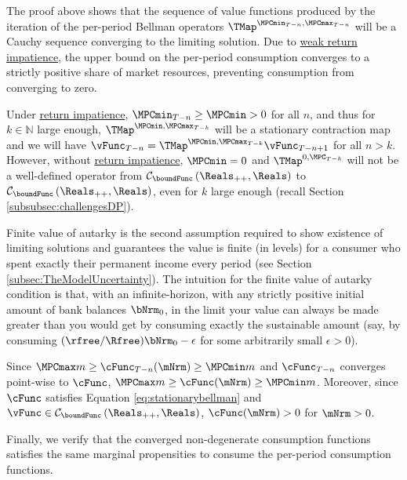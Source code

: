 \documentclass[BufferStockTheory]{subfiles}
\begin{document}
The proof above shows that the sequence of value functions produced by the iteration of the per-period Bellman operators $\TMap^{\MPCmin_{T-n}, \MPCmax_{T-n}}$  will be a Cauchy sequence converging to the limiting solution.
Due to \hyperlink{WRIC}{weak return impatience}, the upper bound on the per-period consumption converges to a strictly positive share of market resources, preventing consumption from converging to zero.




\begin{remark}
Under \hyperlink{RIC}{return impatience}, $\MPCmin_{T-n}\geq \MPCmin>0$ for all $n$, and thus for $k\in \mathbb{N}$ large enough, $\TMap^{\MPCmin, \MPCmax_{T-k}}$ will be a stationary contraction map and we will  have $\vFunc_{T-n} = \TMap^{\MPCmin, \MPCmax_{T-k}}\vFunc_{T-n+1}$ for all $n>k$. However, without \hyperlink{RIC}{return impatience}, $\MPCmin = 0$ and $\TMap^{0, \MPC_{T-k}}$ will not be a well-defined operator from  $\mathcal{C}_{\boundFunc }\left(\Reals_{++},\Reals\right)$ to $\mathcal{C}_{\boundFunc }\left(\Reals_{++},\Reals\right)$, even for $k$ large enough (recall Section \ref{subsubsec:challengesDP}).
\end{remark}


Finite value of autarky is the second assumption required to show existence of limiting solutions and guarantees the value is finite (in levels) for a consumer who spent exactly their permanent income every period (see Section \ref{subsec:TheModelUncertainty}).
The intuition for the finite value of autarky condition is that, with an infinite-horizon, with any strictly positive initial amount of bank balances $\bNrm_{0}$, in the limit your value can always be made greater than you would get by consuming exactly the sustainable amount (say, by consuming $(\rfree/\Rfree)\bNrm_{0}-\epsilon$ for some arbitrarily small $\epsilon>0$).

\begin{remark}\label{remark:cStatStrctPos}
Since $\MPCmax m \geq \cFunc_{T-n}(\mNrm)\geq \MPCmin m$ and $\cFunc_{T-n}$ converges point-wise to $\cFunc$, $\MPCmax m \geq \cFunc(\mNrm)\geq \MPCmin m$. Moreover, since $\cFunc$ satisfies  Equation \eqref{eq:stationarybellman} and $\vFunc \in \mathcal{C}_{\boundFunc }\left(\Reals_{++},\Reals\right) $, $\cFunc(\mNrm)>0$ for $\mNrm>0$. 
\end{remark}

Finally, we verify that the converged non-degenerate consumption functions satisfies the same marginal propensities to consume the per-period consumption functions.
\end{document}
